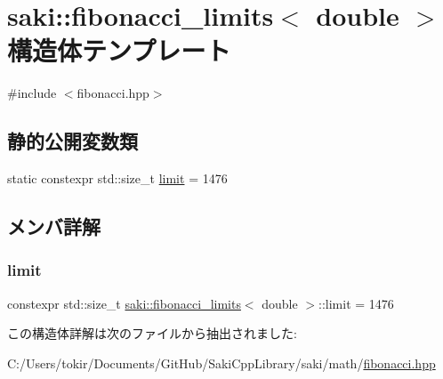 \hypertarget{structsaki_1_1fibonacci__limits_3_01double_01_4}{}\section{saki\+:\+:fibonacci\+\_\+limits$<$ double $>$ 構造体テンプレート}
\label{structsaki_1_1fibonacci__limits_3_01double_01_4}


{\ttfamily \#include $<$fibonacci.\+hpp$>$}

\subsection*{静的公開変数類}
\begin{DoxyCompactItemize}
\item 
static constexpr std\+::size\+\_\+t \mbox{\hyperlink{structsaki_1_1fibonacci__limits_3_01double_01_4_aec5b4bc0d647a837d13bff9adb394f2a}{limit}} = 1476
\end{DoxyCompactItemize}


\subsection{メンバ詳解}
\mbox{\label{structsaki_1_1fibonacci__limits_3_01double_01_4_aec5b4bc0d647a837d13bff9adb394f2a}} 
\subsubsection{\texorpdfstring{limit}{limit}}
{\footnotesize\ttfamily constexpr std\+::size\+\_\+t \mbox{\hyperlink{structsaki_1_1fibonacci__limits}{saki\+::fibonacci\+\_\+limits}}$<$ double $>$\+::limit = 1476\hspace{0.3cm}{\ttfamily [static]}}



この構造体詳解は次のファイルから抽出されました\+:\begin{DoxyCompactItemize}
\item 
C\+:/\+Users/tokir/\+Documents/\+Git\+Hub/\+Saki\+Cpp\+Library/saki/math/\mbox{\hyperlink{fibonacci_8hpp}{fibonacci.\+hpp}}\end{DoxyCompactItemize}
